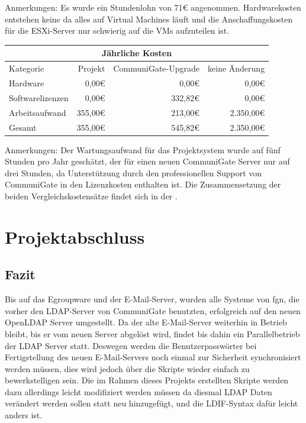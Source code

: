 \documentclass[11pt,a4paper,titlepage=firstiscover,headsepline,bibtotoc]{scrartcl} %
\newcommand{\mcc}[2]{\multicolumn{#1}{|c|}{#2}} %
\begin{document}
\medskip \noindent Anmerkungen: Es wurde ein Stundenlohn von 71\euro{} angenommen. Hardwarekosten entstehen keine da alles auf Virtual Machines läuft und die Anschaffungskosten für die ESXi-Server nur schwierig auf die VMs aufzuteilen ist.

\bigskip\noindent
\begin{tabularx}{\textwidth}{|X|r|r|r|}
\hline
\mcc{4}{Jährliche Kosten}\\
\hline
Kategorie	&	Projekt &	CommuniGate-Upgrade &	keine Änderung\\
\hline
Hardware &	0,00\euro{} &	0,00\euro{} &	0,00\euro{}\\
\hline
Softwarelizenzen &	0,00\euro{} &	332,82\euro{} &	0,00\euro{}\\
\hline
Arbeitsaufwand &	355,00\euro{} &	213,00\euro{} &	2.350,00\euro{}\\
\hhline{|=|=|=|=|}
Gesamt &	355,00\euro{} &	545,82\euro{} &	2.350,00\euro{}\\
\hline
\end{tabularx}

\medskip \noindent Anmerkungen: Der Wartungsaufwand für das Projektsystem wurde auf fünf Stunden pro Jahr geschätzt, der für einen neuen CommuniGate Server nur auf drei Stunden, da Unterstützung durch den professionellen Support von CommuniGate in den Lizenzkosten enthalten ist. Die Zusammensetzung der beiden Vergleichskostensätze findet sich in der .

\section{Projektabschluss}
\subsection{Fazit}
Bis auf das Egroupware und der E-Mail-Server, wurden alle Systeme von fgn, die vorher den LDAP-Server von CommuniGate benutzten, erfolgreich auf den neuen OpenLDAP Server umgestellt. Da der alte E-Mail-Server weiterhin in Betrieb bleibt, bis er vom neuen Server abgelöst wird, findet bis dahin ein Parallelbetrieb der LDAP Server statt. Deswegen werden die Benutzerpasswörter bei Fertigstellung des neuen E-Mail-Servers noch einmal zur Sicherheit synchronisiert werden müssen, dies wird jedoch über die Skripte wieder einfach zu bewerkstelligen sein. Die im Rahmen dieses Projekts erstellten Skripte werden dazu allerdings leicht modifiziert werden müssen da diesmal LDAP Daten verändert werden sollen statt neu hinzugefügt, und die LDIF-Syntax dafür leicht anders ist.
\end{document}

